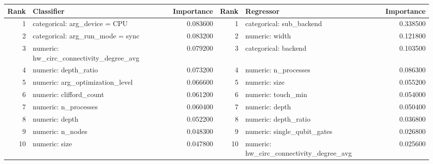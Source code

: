 \begin{tabular}{rlrrlr}
\toprule
Rank & Classifier & Importance & Rank & Regressor & Importance \\
\midrule
1 & categorical: arg_device = CPU & 0.083600 & 1 & categorical: sub_backend & 0.338500 \\
2 & categorical: arg_run_mode = sync & 0.083200 & 2 & numeric: width & 0.121800 \\
3 & numeric: hw_circ_connectivity_degree_avg & 0.079200 & 3 & categorical: backend & 0.103500 \\
4 & numeric: depth_ratio & 0.073200 & 4 & numeric: n_processes & 0.086300 \\
5 & numeric: arg_optimization_level & 0.066600 & 5 & numeric: size & 0.055200 \\
6 & numeric: clifford_count & 0.061200 & 6 & numeric: touch_min & 0.054000 \\
7 & numeric: n_processes & 0.060400 & 7 & numeric: depth & 0.050400 \\
8 & numeric: depth & 0.052200 & 8 & numeric: depth_ratio & 0.036800 \\
9 & numeric: n_nodes & 0.048300 & 9 & numeric: single_qubit_gates & 0.026800 \\
10 & numeric: size & 0.047800 & 10 & numeric: hw_circ_connectivity_degree_avg & 0.025600 \\
\bottomrule
\end{tabular}
